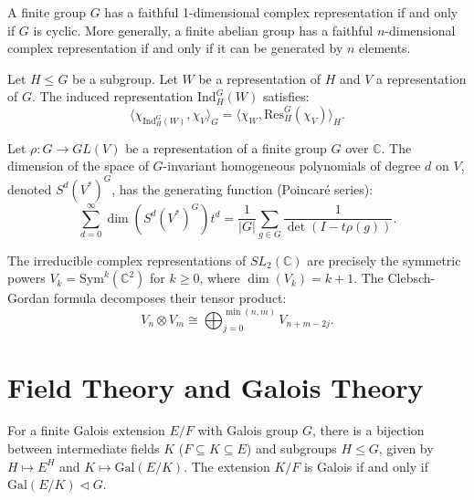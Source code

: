 \begin{remark}
A finite group $G$ has a faithful 1-dimensional complex representation if and only if $G$ is cyclic. More generally, a finite abelian group has a faithful $n$-dimensional complex representation if and only if it can be generated by $n$ elements.
\end{remark}

\begin{theorem}
Let $H \le G$ be a subgroup. Let $W$ be a representation of $H$ and $V$ a representation of $G$. The induced representation $\mathrm{Ind}_H^G(W)$ satisfies:
\[ \langle \chi_{\mathrm{Ind}_H^G(W)}, \chi_V \rangle_G = \langle \chi_W, \mathrm{Res}_H^G(\chi_V) \rangle_H. \]
\end{theorem}

\begin{theorem}
Let $\rho: G \to GL(V)$ be a representation of a finite group $G$ over $\mathbb{C}$. The dimension of the space of $G$-invariant homogeneous polynomials of degree $d$ on $V$, denoted $S^d(V^*)^G$, has the generating function (Poincar\'e series):
\[ \sum_{d=0}^\infty \dim(S^d(V^*)^G) t^d = \frac{1}{|G|} \sum_{g \in G} \frac{1}{\det(I - t \rho(g))}. \]
\end{theorem}

\begin{example}[Representations of $SL_2$]
The irreducible complex representations of $SL_2(\mathbb{C})$ are precisely the symmetric powers $V_k = \mathrm{Sym}^k(\mathbb{C}^2)$ for $k \ge 0$, where $\dim(V_k) = k+1$. The Clebsch-Gordan formula decomposes their tensor product:
\[ V_n \otimes V_m \cong \bigoplus_{j=0}^{\min(n,m)} V_{n+m-2j}. \]
\end{example}

\section{Field Theory and Galois Theory}

\begin{theorem}
For a finite Galois extension $E/F$ with Galois group $G$, there is a bijection between intermediate fields $K$ ($F \subseteq K \subseteq E$) and subgroups $H \le G$, given by $H \mapsto E^H$ and $K \mapsto \mathrm{Gal}(E/K)$. The extension $K/F$ is Galois if and only if $\mathrm{Gal}(E/K) \triangleleft G$.
\end{theorem}

